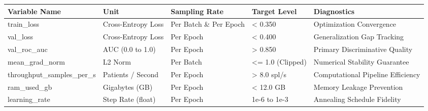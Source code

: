\begin{tabular}{lllll}
\toprule
Variable Name & Unit & Sampling Rate & Target Level & Diagnostics \\
\midrule
train\_loss & Cross-Entropy Loss & Per Batch \& Per Epoch & < 0.350 & Optimization Convergence \\
val\_loss & Cross-Entropy Loss & Per Epoch & < 0.400 & Generalization Gap Tracking \\
val\_roc\_auc & AUC (0.0 to 1.0) & Per Epoch & > 0.850 & Primary Discriminative Quality \\
mean\_grad\_norm & L2 Norm & Per Batch & <= 1.0 (Clipped) & Numerical Stability Guarantee \\
throughput\_samples\_per\_s & Patients / Second & Per Epoch & > 8.0 spl/s & Computational Pipeline Efficiency \\
ram\_used\_gb & Gigabytes (GB) & Per Epoch & < 12.0 GB & Memory Leakage Prevention \\
learning\_rate & Step Rate (float) & Per Epoch & 1e-6 to 1e-3 & Annealing Schedule Fidelity \\
\bottomrule
\end{tabular}
